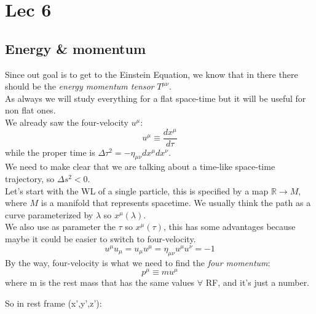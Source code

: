 \section{Lec 6}
\subsection{Energy \& momentum}
Since out goal is to get to the Einstein Equation, we know that in there there should be the \emph{energy momentum tensor} $T^{\mu \nu }$. \\
As always we will study everything for a flat space-time but it will be useful for non flat ones. \\
We already saw the four-velocity $u^{\mu}$:
\[
u^{\mu } \equiv \frac{d x^{\mu }}{d\tau }
\]
while the proper time is $\Delta \tau^{2} = - \eta_{\mu \nu }dx^{\mu }dx^{\nu }$. \\
We need to make clear that we are talking about a time-like space-time trajectory, so $\Delta s^{2}<0$. \\
Let's start with the WL of a single particle, this is specified by a map $\mathbb{R}\to M$, where $M$ is a manifold that represents spacetime. We usually think the path as a curve parameterized by $\lambda $ so $x^{\mu }\left( \lambda  \right)$. \\
We also use as parameter the $\tau $ so $x^{\mu }\left( \tau  \right)$, this has some advantages because maybe it could be easier to switch to four-velocity.
\begin{equation}
u^{\mu }u_{\mu } = u_{\mu }u^{\mu } = \eta_{\mu \nu } u^{\mu }u^{\nu } = -1
\end{equation}
By the way, four-velocity is what we need to find the \emph{four momentum}:
\begin{equation}
p^{\mu } \equiv m u^{\mu }
\end{equation}
where m is the rest mass that has the same values $\forall$ RF, and it's just a number.

So in rest frame (x',y',z'):

